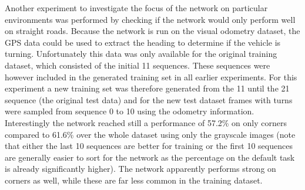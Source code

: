 Another experiment to investigate the focus of the network on particular environments was performed by checking if the network would only perform well on straight roads. Because the network is run on the visual odometry dataset, the GPS data could be used to extract the heading to determine if the vehicle is turning. Unfortunately this data was only available for the original training dataset, which consisted of the initial 11 sequences. These sequences were however included in the generated training set in all earlier experiments. For this experiment a new training set was therefore generated from the 11 until the 21 sequence (the original test data) and for the new test dataset frames with turns were sampled from sequence 0 to 10 using the odometry information. Interestingly the network reached still a performance of 57.2\% on only corners compared to 61.6\% over the whole dataset using only the grayscale images (note that either the last 10 sequences are better for training or the first 10 sequences are generally easier to sort for the network as the percentage on the default task is already significantly higher). The network apparently performs strong on corners as well, while these are far less common in the training dataset. 



